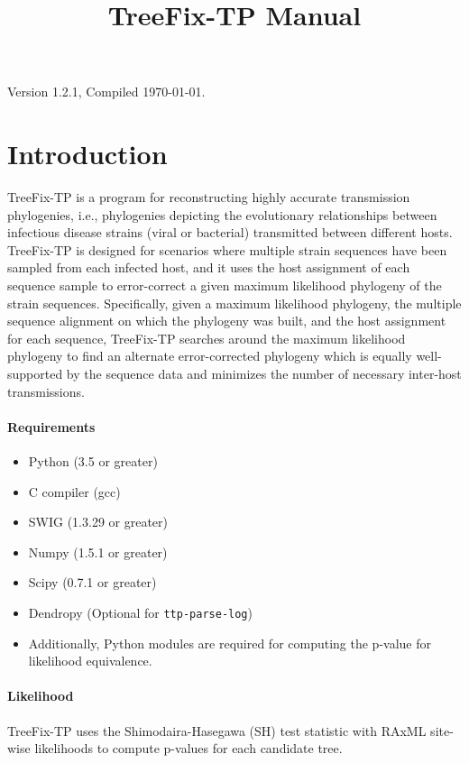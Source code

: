 \documentclass[11pt]{article}
\title{TreeFix-TP Manual}
\date{}
\begin{document}
\maketitle
\vspace{-3cm}
\begin{center}
    Version 1.2.1, Compiled \today.
\end{center}

\section{Introduction}
TreeFix-TP is a program for reconstructing highly accurate transmission phylogenies, i.e., phylogenies depicting the evolutionary relationships between infectious disease strains (viral or bacterial) transmitted between different hosts. TreeFix-TP is designed for scenarios where multiple strain sequences have been sampled from each infected host, and it uses the host assignment of each sequence sample to error-correct a given maximum likelihood phylogeny of the strain sequences. Specifically, given a maximum likelihood phylogeny, the multiple sequence alignment on which the phylogeny was built, and the host assignment for each sequence, TreeFix-TP searches around the maximum likelihood phylogeny to find an alternate error-corrected phylogeny which is equally well-supported by the sequence data and minimizes the number of necessary inter-host transmissions.

\paragraph{Requirements}
    \begin{itemize}
        \item Python (3.5 or greater)
        \item C compiler (gcc)
        \item SWIG (1.3.29 or greater)
        \item Numpy (1.5.1 or greater)
        \item Scipy (0.7.1 or greater)
        \item Dendropy (Optional for \texttt{ttp-parse-log})
        \item Additionally, Python modules are required for computing the p-value for likelihood equivalence.
    \end{itemize}

\paragraph{Likelihood}
TreeFix-TP uses the Shimodaira-Hasegawa (SH) test statistic with RAxML site-wise likelihoods to compute
p-values for each candidate tree.
\end{document}
